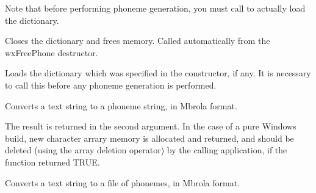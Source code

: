 Note that before performing phoneme generation, you must call  to
actually load the dictionary.

\label{wxfreephonecleanup}


Closes the dictionary and frees memory. Called automatically from the wxFreePhone destructor.

\label{wxfreephoneinit}


Loads the dictionary which was specified in the constructor, if any. It is necessary
to call this before any phoneme generation is performed.

\label{wxfreephonetexttophoneme}




Converts a text string to a phoneme string, in Mbrola format.

The result is returned in the second argument. In the case of a pure Windows build,
new character arrary memory is allocated and returned, and should be deleted (using the array
deletion operator) by the calling application, if the function returned TRUE.

\label{wxfreephonetexttophonemefile}




Converts a text string to a file of phonemes, in Mbrola format.


\section{}\label{wxmbrola}

